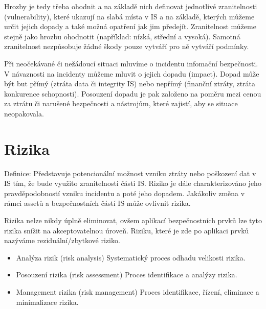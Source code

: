 \documentclass{szzclass}
\begin{document}
Hrozby je tedy třeba ohodnit a na základě nich definovat jednotlivé zranitelnosti (vulnerability), které ukazují na slabá místa v IS a na
základě, kterých můžeme určit jejich dopady a také možná opatření jak jim předejít. Zranitelnost můžeme stejně jako hrozbu ohodnotit
(například: nízká, střední a vysoká). Samotná zranitelnost nezpůsobuje žádné škody pouze vytváří pro ně vytváří podmínky.

Při neočekávané či nežádoucí situaci mluvíme o incidentu infomační bezpečnosti. V návaznosti na incidenty můžeme mluvit o jejich dopadu (impact).
Dopad může být but přímý (ztráta data či integrity IS) nebo nepřímý (finanční ztráty, ztráta konkurence schopnosti). Posouzení dopadu je pak založeno
na poměru mezi cenou za ztrátu či narušené bezpečnosti a nástrojům, které zajistí, aby se situace neopakovala.

\section{Rizika}

Definice: Představuje potencionální možnost vzniku ztráty nebo poškození dat v IS tím, že bude využito zranitelnosti části IS. Riziko je dále charakterizováno
jeho pravděpodobností vzniku incidentu a poté jeho dopadem. Jakákoliv změna v rámci assetů a bezpečnostních částí IS může ovlivnit rizika.

Rizika nelze nikdy úplně eliminovat, ovšem aplikací bezpečnostních prvků lze tyto rizika snížit na akceptovatelnou úroveň. Riziku, které je zde po aplikaci
prvků nazýváme reziduální/zbytkové riziko.

\begin{itemize}
    \item Analýza rizik (risk analysis)
          Systematický proces odhadu velikosti rizika.
    \item Posouzení rizika (risk assessment)
          Proces identifikace a analýzy rizika.
    \item Management rizika (risk management)
          Proces identifikace, řízení, eliminace a minimalizace rizika.
\end{itemize}
\end{document}

